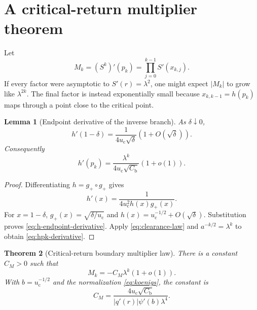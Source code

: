 \documentclass[11pt]{article}
\newtheorem{theorem}{Theorem}[section]
\newtheorem{lemma}[theorem]{Lemma}
\theoremstyle{definition}
\theoremstyle{remark}
\newcommand{\uc}{u_{\mathrm c}}
\begin{document}
\section{A critical-return multiplier theorem}
\label{sec:multiplier}

Let
\begin{equation}\label{eq:Mk-definition}
 M_k=(S^k)'(p_k)
 =\prod_{j=0}^{k-1}S'(x_{k,j}).
\end{equation}
If every factor were asymptotic to $S'(r)=\lambda^2$, one might expect
$|M_k|$ to grow like $\lambda^{2k}$.  The final factor is instead
exponentially small because $x_{k,k-1}=h(p_k)$ maps through a point close to
the critical point.

\begin{lemma}[Endpoint derivative of the inverse branch]
\label{lem:h-endpoint-derivative}
As $\delta\downarrow0$,
\begin{equation}\label{eq:h-endpoint-derivative}
 h'(1-\delta)
 =\frac1{4\uc\sqrt\delta}(1+O(\sqrt\delta)).
\end{equation}
Consequently
\begin{equation}\label{eq:hpk-derivative}
 h'(p_k)
 =\frac{\lambda^k}{4\uc\sqrt{C_{\mathrm b}}}(1+o(1)).
\end{equation}
\end{lemma}

\begin{proof}
Differentiating $h=g_+\circ g_+$ gives
\begin{equation}\label{eq:hprime-exact}
 h'(x)=\frac1{4\uc^2h(x)g_+(x)}.
\end{equation}
For $x=1-\delta$,
$g_+(x)=\sqrt{\delta/\uc}$ and
$h(x)=\uc^{-1/2}+O(\sqrt\delta)$.  Substitution proves
\eqref{eq:h-endpoint-derivative}.  Apply
\eqref{eq:clearance-law} and $a^{-k/2}=\lambda^k$ to obtain
\eqref{eq:hpk-derivative}.
\end{proof}

\begin{theorem}[Critical-return boundary multiplier law]
\label{thm:multiplier-law}
There is a constant $C_M>0$ such that
\begin{equation}\label{eq:multiplier-law}
 \boxed{
 M_k=-C_M\lambda^k(1+o(1)).}
\end{equation}
With $b=\uc^{-1/2}$ and the normalization
\eqref{eq:koenigs}, the constant is
\begin{equation}\label{eq:CM-formula}
 C_M
 =\frac{4\uc\sqrt{C_{\mathrm b}}}
 {|q'(r)|\psi'(b)\lambda^4}.
\end{equation}
\end{theorem}
\end{document}
